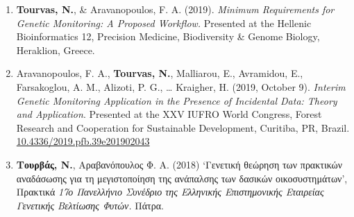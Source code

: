 \documentclass[12pt,]{scrartcl}
\begin{document}
\begin{enumerate}

\item \textbf{Tourvas, N.}, \& Aravanopoulos, F. A. (2019). \textit{Minimum Requirements for Genetic Monitoring: A Proposed Workflow.} Presented at the Hellenic Bioinformatics 12, Precision Medicine, Biodiversity \& Genome Biology, Heraklion, Greece.

\item Aravanopoulos, F. A., \textbf{Tourvas, N.}, Malliarou, E., Avramidou, E., Farsakoglou, A. M., Alizoti, P. G., … Kraigher, H. (2019, October 9). \textit{Interim Genetic Monitoring Application in the Presence of Incidental Data: Theory and Application}. Presented at the XXV IUFRO World Congress, Forest Research and Cooperation for Sustainable Development, Curitiba, PR, Brazil. \href{https://doi.org/10.4336/2019.pfb.39e201902043}{10.4336/2019.pfb.39e201902043}



\item {\textbf{Τουρβάς, Ν.}, Αραβανόπουλος Φ. Α. (2018) ‘Γενετική θεώρηση των πρακτικών αναδάσωσης για τη μεγιστοποίηση της ανάπαλσης των δασικών οικοσυστημάτων’, Πρακτικά \textit{17ο Πανελλήνιο Συνέδριο της Ελληνικής Επιστημονικής Εταιρείας Γενετικής Βελτίωσης Φυτών.} Πάτρα.}


\end{enumerate}
\end{document}
